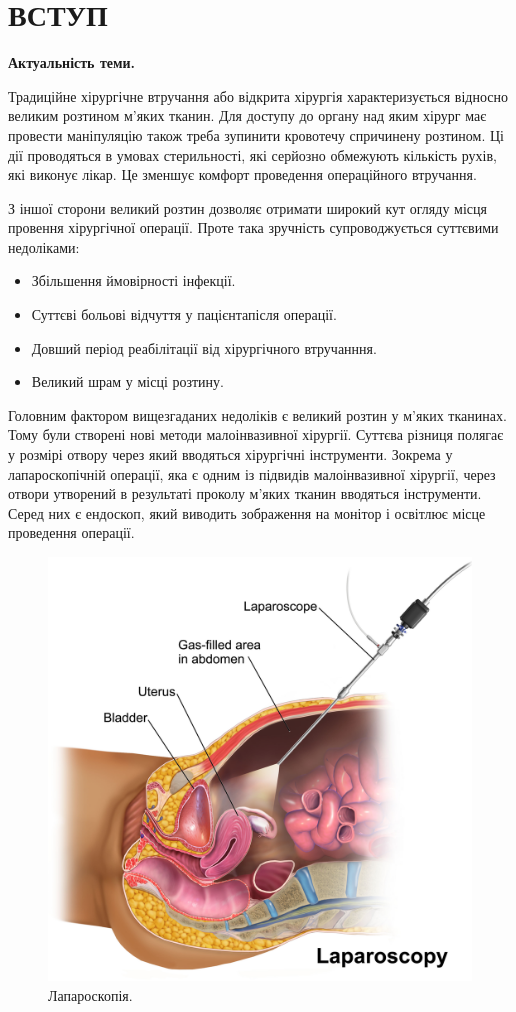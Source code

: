 \chapter{ВСТУП}

\nocite{bahvalov-et-al,benerdge-et-al} 

\textbf{Актуальність теми.}

Традиційне хірургічне втручання або відкрита хірургія характеризується відносно великим розтином м'яких тканин. Для 
доступу до органу над яким хірург має провести маніпуляцію також треба зупинити кровотечу спричинену розтином. Ці дії 
проводяться в умовах стерильності, які серйозно обмежують кількість рухів, які виконує лікар. Це зменшує комфорт 
проведення операційного втручання.

З іншої сторони великий розтин дозволяє отримати широкий кут огляду місця провення хірургічної операції. Проте така 
зручність супроводжується суттєвими недоліками:
\begin{itemize}
  \item Збільшення ймовірності інфекції.
  \item Суттєві больові відчуття у пацієнта після операції.
  \item Довший період реабілітації від хірургічного втручанння.
  \item Великий шрам у місці розтину.
\end{itemize}

Головним фактором вищезгаданих недоліків є великий розтин у м'яких тканинах. Тому були створені нові методи 
малоінвазивної хірургії. Суттєва різниця полягає у розмірі отвору через який вводяться хірургічні інструменти. 
Зокрема у лапароскопічній операції, яка є одним із підвидів малоінвазивної хірургії, через отвори утворений в результаті 
проколу м'яких тканин вводяться інструменти. Серед них є ендоскоп, який виводить зображення на монітор і освітлює місце 
проведення операції.

\begin{figure}[h!]
  \centering
  \includegraphics[width=0.4\linewidth]{images/intro_laparoscopy.png}
  \caption{Лапароскопія.}
  \label{fig:intro_laparoscopy}
\end{figure}

